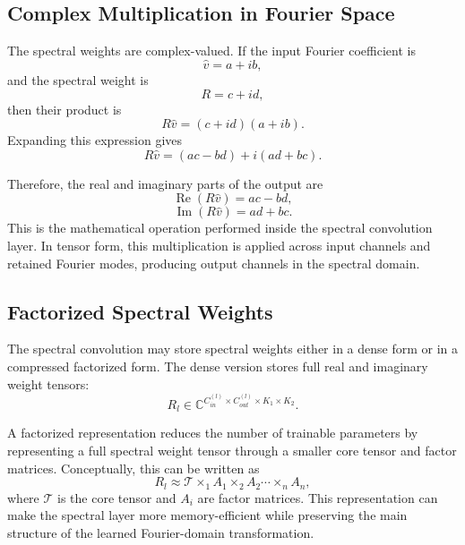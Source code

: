 \subsection{Complex Multiplication in Fourier Space}

The spectral weights are complex-valued. If the input Fourier coefficient is
\begin{equation}
\hat{v}
=
a + ib,
\end{equation}
and the spectral weight is
\begin{equation}
R
=
c + id,
\end{equation}
then their product is
\begin{equation}
R\hat{v}
=
(c+id)(a+ib).
\end{equation}
Expanding this expression gives
\begin{equation}
R\hat{v}
=
(ac-bd)
+
i(ad+bc).
\end{equation}

Therefore, the real and imaginary parts of the output are
\begin{equation}
\operatorname{Re}(R\hat{v})
=
ac-bd,
\end{equation}
\begin{equation}
\operatorname{Im}(R\hat{v})
=
ad+bc.
\end{equation}
This is the mathematical operation performed inside the spectral convolution layer. In tensor form, this multiplication is applied across input channels and retained Fourier modes, producing output channels in the spectral domain.

\subsection{Factorized Spectral Weights}

The spectral convolution may store spectral weights either in a dense form or in a compressed factorized form. The dense version stores full real and imaginary weight tensors:
\begin{equation}
R_l
\in
\mathbb{C}^{C_{in}^{(l)} \times C_{out}^{(l)} \times K_1 \times K_2}.
\end{equation}

A factorized representation reduces the number of trainable parameters by representing a full spectral weight tensor through a smaller core tensor and factor matrices. Conceptually, this can be written as
\begin{equation}
R_l
\approx
\mathcal{T}
\times_1 A_1
\times_2 A_2
\cdots
\times_n A_n,
\end{equation}
where \(\mathcal{T}\) is the core tensor and \(A_i\) are factor matrices. This representation can make the spectral layer more memory-efficient while preserving the main structure of the learned Fourier-domain transformation.

